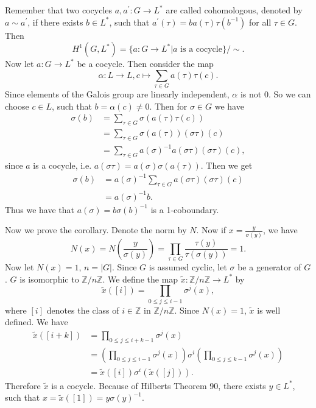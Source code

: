 \documentclass[12pt]{article}
\begin{document}
Remember that two cocycles $a, a^\prime\colon G\to L^*$ are called cohomologous, denoted by $a\sim a^\prime$, if there exists $b\in L^*$, such that $a^\prime(\tau)=ba(\tau)\tau(b^{-1})$ for all $\tau\in G$. Then 
$$H^1(G,L^*)=\{a\colon G\to L^*|a\text{ is a cocycle}\}/\sim.$$
Now let $a\colon G\to L^*$ be a cocycle. Then consider the map 
$$\alpha\colon L\to L, c\mapsto\sum_{\tau\in G}a(\tau)\tau(c).$$
Since elements of the Galois group are linearly independent, $\alpha$ is not $0$. So we can choose $c\in L$, such that $b=\alpha(c)\neq 0$. Then for $\sigma\in G$ we have
\begin{align*}
\sigma(b)&=\sum_{\tau\in G}\sigma(a(\tau)\tau(c))\\
&=\sum_{\tau\in G}\sigma(a(\tau))(\sigma\tau)(c)\\
&=\sum_{\tau\in G}a(\sigma)^{-1}a(\sigma\tau)(\sigma\tau)(c),
\end{align*}
since $a$ is a cocycle, i.e. $a(\sigma\tau)=a(\sigma)\sigma(a(\tau))$. Then we get
\begin{align*}
\sigma(b)&=a(\sigma)^{-1}\sum_{\tau\in G}a(\sigma\tau)(\sigma\tau)(c)\\
&=a(\sigma)^{-1}b.
\end{align*}
Thus we have that $a(\sigma)=b\sigma(b)^{-1}$ is a 1-coboundary.

Now we prove the corollary. Denote the norm by $N$. Now if $x=\frac{y}{\sigma(y)}$, we have
$$N(x)=N\left(\frac{y}{\sigma(y)}\right)=\prod_{\tau\in G}\frac{\tau(y)}{\tau(\sigma(y))}=1.$$
Now let $N(x)=1$, $n=|G|$. Since $G$ is assumed cyclic, let $\sigma$ be a generator of $G$. $G$ is isomorphic to $\mathbb{Z}/n\mathbb{Z}$. We define the map $\tilde{x}\colon \mathbb{Z}/n\mathbb{Z}\to L^*$ by
$$\tilde{x}([i])=\prod_{0\leq j\leq i-1}\sigma^j(x),$$
where $[i]$ denotes the class of $i\in\mathbb{Z}$ in $\mathbb{Z}/n\mathbb{Z}$. Since $N(x)=1$, $\tilde{x}$ is well defined. We have
\begin{align*}
\tilde{x}([i+k])&=\prod_{0\leq j\leq i+k-1}\sigma^j(x)\\
&=\left(\prod_{0\leq j\leq i-1}\sigma^j(x)\right)\sigma^i\left(\prod_{0\leq j\leq k-1}\sigma^j(x)\right)\\
&=\tilde{x}([i])\sigma^i(\tilde{x}([j])).
\end{align*}
Therefore $\tilde{x}$ is a cocycle. Because of Hilberts Theorem 90, there exists $y\in L^*$, such that $x=\tilde{x}([1])=y\sigma(y)^{-1}$.
\end{document}
